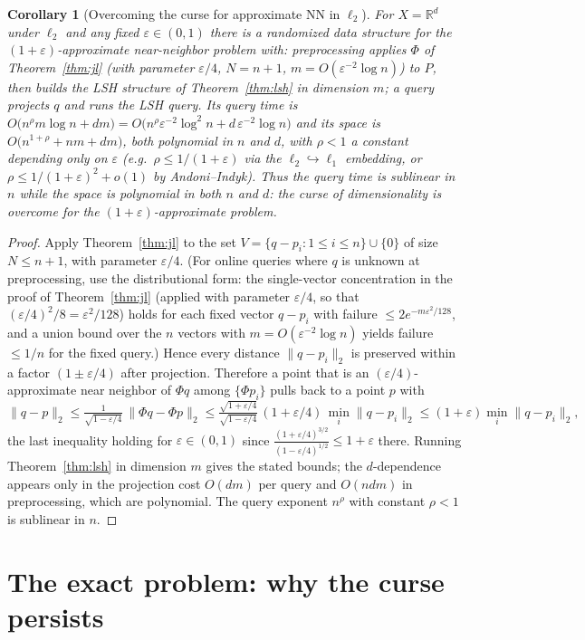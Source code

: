 \documentclass{amsart}
\newtheorem{corollary}{Corollary}
\newcommand{\R}{\mathbb{R}}
\newcommand{\eps}{\varepsilon}
\begin{document}
\begin{corollary}[Overcoming the curse for approximate NN in $\ell_2$]\label{cor:curse}
For $X=\R^d$ under $\ell_2$ and any fixed $\eps\in(0,1)$ there is a randomized data
structure for the $(1+\eps)$-approximate near-neighbor problem with:
preprocessing applies $\Phi$ of Theorem~\ref{thm:jl} (with parameter $\eps/4$,
$N=n+1$, $m=O(\eps^{-2}\log n)$) to $P$, then builds the LSH structure of
Theorem~\ref{thm:lsh} in dimension $m$; a query projects $q$ and runs the LSH query.
Its query time is
$O\big(n^{\rho}m\log n + dm\big)=O\big(n^{\rho}\eps^{-2}\log^2 n + d\,\eps^{-2}\log n\big)$
and its space is $O\big(n^{1+\rho}+nm+dm\big)$, both polynomial in $n$ and $d$, with
$\rho<1$ a constant depending only on $\eps$ (e.g.\ $\rho\le 1/(1+\eps)$ via the
$\ell_2\hookrightarrow\ell_1$ embedding, or $\rho\le 1/(1+\eps)^2+o(1)$ by
Andoni--Indyk).  Thus the query time is \emph{sublinear in $n$ while the space is
polynomial in both $n$ and $d$}: the curse of dimensionality is overcome for the
$(1+\eps)$-approximate problem.
\end{corollary}
\begin{proof}
Apply Theorem~\ref{thm:jl} to the set $V=\{q-p_i:1\le i\le n\}\cup\{0\}$ of size
$N\le n+1$, with parameter $\eps/4$.  (For online queries where $q$ is unknown at
preprocessing, use the distributional form: the single-vector concentration in the
proof of Theorem~\ref{thm:jl} (applied with parameter $\eps/4$, so that
$(\eps/4)^2/8=\eps^2/128$) holds for each fixed vector $q-p_i$ with failure
$\le 2e^{-m\eps^2/128}$, and a union bound over the $n$ vectors with
$m=O(\eps^{-2}\log n)$ yields failure $\le 1/n$ for the fixed query.)  Hence every
distance $\|q-p_i\|_2$ is preserved within a factor $(1\pm\eps/4)$ after projection.
Therefore a point that is an $(\eps/4)$-approximate near neighbor of $\Phi q$ among
$\{\Phi p_i\}$ pulls back to a point $p$ with
\[
\|q-p\|_2\le \tfrac{1}{\sqrt{1-\eps/4}}\,\|\Phi q-\Phi p\|_2
\le \tfrac{\sqrt{1+\eps/4}}{\sqrt{1-\eps/4}}\,(1+\eps/4)\,\min_i\|q-p_i\|_2
\le (1+\eps)\min_i\|q-p_i\|_2,
\]
the last inequality holding for $\eps\in(0,1)$ since
$\tfrac{(1+\eps/4)^{3/2}}{(1-\eps/4)^{1/2}}\le 1+\eps$ there.  Running
Theorem~\ref{thm:lsh} in dimension $m$ gives the stated bounds; the $d$-dependence
appears only in the projection cost $O(dm)$ per query and $O(ndm)$ in preprocessing,
which are polynomial.  The query exponent $n^{\rho}$ with constant $\rho<1$ is
sublinear in $n$.
\end{proof}

\section{The exact problem: why the curse persists}
\end{document}
